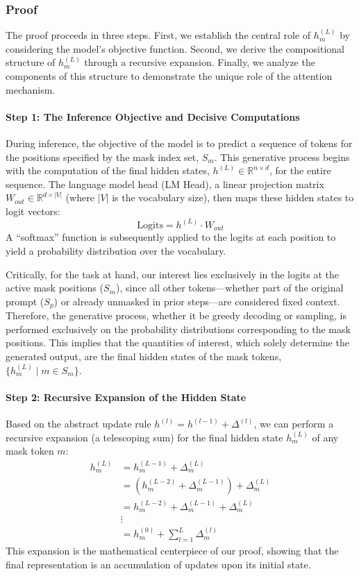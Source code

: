 \subsubsection{Proof}

The proof proceeds in three steps. First, we establish the central role of $h_m^{(L)}$ by considering the model's objective function. Second, we derive the compositional structure of $h_m^{(L)}$ through a recursive expansion. Finally, we analyze the components of this structure to demonstrate the unique role of the attention mechanism.

\paragraph{Step 1: The Inference Objective and Decisive Computations}
During inference, the objective of the model is to predict a sequence of tokens for the positions specified by the mask index set, $S_m$. This generative process begins with the computation of the final hidden states, $h^{(L)} \in \mathbb{R}^{n \times d}$, for the entire sequence. The language model head (LM Head), a linear projection matrix $W_{out} \in \mathbb{R}^{d \times |V|}$ (where $|V|$ is the vocabulary size), then maps these hidden states to logit vectors:
$$ \text{Logits} = h^{(L)} \cdot W_{out} $$
A ``softmax'' function is subsequently applied to the logits at each position to yield a probability distribution over the vocabulary.

Critically, for the task at hand, our interest lies exclusively in the logits at the active mask positions ($S_m$), since all other tokens—whether part of the original prompt ($S_p$) or already unmasked in prior steps—are considered fixed context. Therefore, the generative process, whether it be greedy decoding or sampling, is performed exclusively on the probability distributions corresponding to the mask positions. This implies that the quantities of interest, which solely determine the generated output, are the final hidden states of the mask tokens, $\{h_m^{(L)} \mid m \in S_m\}$. 

\paragraph{Step 2: Recursive Expansion of the Hidden State}
Based on the abstract update rule $h^{(l)} = h^{(l-1)} + \Delta^{(l)}$, we can perform a recursive expansion (a telescoping sum) for the final hidden state $h_m^{(L)}$ of any mask token $m$:
\begin{align*}
    h_m^{(L)} &= h_m^{(L-1)} + \Delta_m^{(L)} \\
              &= (h_m^{(L-2)} + \Delta_m^{(L-1)}) + \Delta_m^{(L)} \\
              &= h_m^{(L-2)} + \Delta_m^{(L-1)} + \Delta_m^{(L)} \\
              &\vdots \\
              &= h_m^{(0)} + \sum_{l=1}^{L} \Delta_m^{(l)} \label{eq:telescoping_sum}
\end{align*}
This expansion is the mathematical centerpiece of our proof, showing that the final representation is an accumulation of updates upon its initial state.

